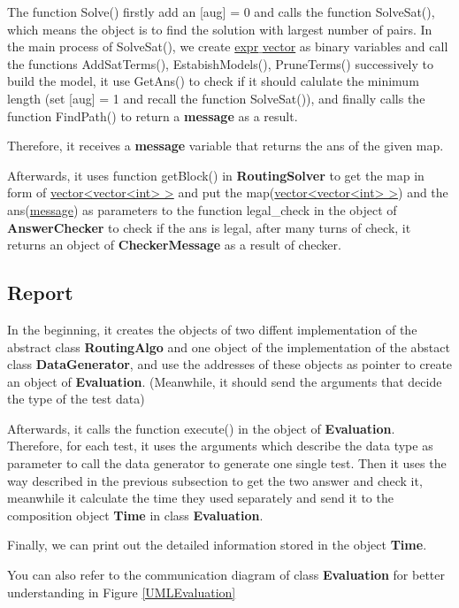 \documentclass[twocolumn]{article}
\begin{document}
The function Solve() firstly add an [aug] = 0 and calls the function SolveSat(), which means the object is to find the solution with largest number of pairs. In the main process of SolveSat(), we create \underline{expr$\_$vector} as binary variables and call the functions AddSatTerms(), EstabishModels(), PruneTerms() successively to build the model, it use GetAns() to check if it should calulate the minimum length (set [aug] = 1 and recall the function SolveSat()), and finally calls the function FindPath() to return a \textbf{message} as a result.

Therefore, it receives a \textbf{message} variable that returns the ans of the given map.

Afterwards, it uses function getBlock() in \textbf{RoutingSolver} to get the map in form of \underline{vector<vector<int> >} and put the map(\underline{vector<vector<int> >}) and the ans(\underline{message}) as parameters to the function legal\_check in the object of \textbf{AnswerChecker} to check if the ans is legal, after many turns of check, it returns an object of \textbf{CheckerMessage} as a result of checker.

\subsection{Report}

In the beginning, it creates the objects of two diffent implementation of the abstract class \textbf{RoutingAlgo} and one object of the implementation of the abstact class \textbf{DataGenerator}, and use the addresses of these objects as pointer to create an object of \textbf{Evaluation}. (Meanwhile, it should send the arguments that decide the type of the test data)

Afterwards, it calls the function execute() in the object of \textbf{Evaluation}. Therefore, for each test, it uses the arguments which describe the data type as parameter to call the data generator to generate one single test. Then it uses the way described in the previous subsection to get the two answer and check it, meanwhile it calculate the time they used separately and send it to the composition object \textbf{Time} in class \textbf{Evaluation}.

Finally, we can print out the detailed information stored in the object \textbf{Time}.

You can also refer to the communication diagram of class \textbf{Evaluation} for better understanding in Figure \ref{UMLEvaluation}
\end{document}
